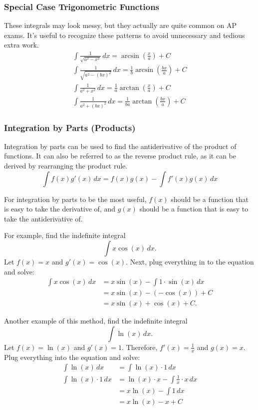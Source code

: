 \documentclass[12pt]{article}
\begin{document}
\subsubsection{Special Case Trigonometric Functions}
\label{sec:arctanintegral}
These integrals may look messy, but they actually are quite common on AP exams. It's useful to recognize these patterns to avoid unnecessary and tedious extra work.
\begin{gather*}
	\int \frac{1}{\sqrt{a^2 - x^2}} \, dx = \arcsin \left( \frac{x}{a} \right) + C \\[6pt]
	\int \frac{1}{\sqrt{a^2 - (bx)^2}} \, dx = \frac{1}{b} \arcsin \left( \frac{bx}{a} \right) + C \\[6pt]
	\int \frac{1}{a^2 + x^2} \, dx = \frac{1}{a} \arctan \left( \frac{x}{a} \right) + C \\[6pt]
	\int \frac{1}{a^2 + (bx)^2} \, dx = \frac{1}{ba} \arctan \left( \frac{bx}{a} \right) + C
\end{gather*}

\subsubsection{Integration by Parts (Products)}
Integration by parts can be used to find the antiderivative of the product of functions. It can also be referred to as the reverse product rule, as it can be derived by rearranging the product rule.
\[ \int f(x) g'(x) \, dx = f(x) g(x) - \int f'(x) g(x) \, dx \]

For integration by parts to be the most useful, $f(x)$ should be a function that is easy to take the derivative of, and $g(x)$ should be a function that is easy to take the antiderivative of.

\noindent For example, find the indefinite integral
\[ \int x \cos(x) \, dx. \]
Let $f(x) = x$ and $g'(x) = \cos(x)$. Next, plug everything in to the equation and solve:
\begin{align*}
	\int x \cos(x) \, dx & = x \sin(x) - \int 1 \cdot \sin(x) \, dx  \\
	& = x \sin(x) - \left( -\cos(x) \right) + C \\
	& = x\sin(x) + \cos(x) + C.
\end{align*}

\noindent Another example of this method, find the indefinite integral
\[ \int \ln(x) \, dx. \]
Let $f(x) = \ln(x)$ and $g'(x) = 1$. Therefore, $f'(x) = \frac{1}{x}$ and $g(x) = x$. Plug everything into the equation and solve:
\begin{align*}
	\int \ln(x) \, dx         & = \int \ln(x) \cdot 1 \, dx                       \\
	\int \ln(x) \cdot 1 \, dx & = \ln(x) \cdot x - \int \frac{1}{x} \cdot x \, dx \\[6pt]
	& = x \ln(x) - \int 1 \, dx                         \\
	& = x \ln(x) - x + C
\end{align*}
\end{document}
